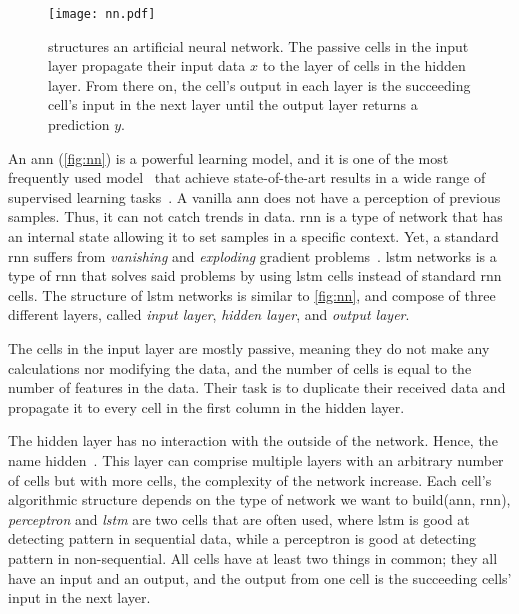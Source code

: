 \begin{figure}
    \centering
    \texttt{[image: nn.pdf]}
    \caption[Architecture - \Acl{ann}]{structures an artificial neural network. The passive cells in the input layer propagate their input data $x$ to the layer of cells in the hidden layer. From there on, the cell's output in each layer is the succeeding cell's input in the next layer until the output layer returns a prediction $y$.}
    \label{fig:nn}
\end{figure}

An \ac{ann} (\autoref{fig:nn}) is a powerful learning model, and it is one of the most frequently used model~\cite{hunt1992neural} that achieve state-of-the-art results in a wide range of supervised learning tasks~\cite{lipton2015critical}. A vanilla \ac{ann} does not have a perception of previous samples. Thus, it can not catch trends in data. \ac{rnn} is a type of network that has an internal state allowing it to set samples in a specific context. Yet, a standard \ac{rnn} suffers from \emph{vanishing} and \emph{exploding} gradient problems~\cite{bengio1994learning}. \ac{lstm} networks is a type of \ac{rnn} that solves said problems by using \ac{lstm} cells instead of standard \ac{rnn} cells. The structure of \ac{lstm} networks is similar to \autoref{fig:nn}, and compose of three different layers, called \emph{input layer}, \emph{hidden layer}, and \emph{output layer}.

The cells in the input layer are mostly passive, meaning they do not make any calculations nor modifying the data, and the number of cells is equal to the number of features in the data. Their task is to duplicate their received data and propagate it to every cell in the first column in the hidden layer.

The hidden layer has no interaction with the outside of the network. Hence, the name hidden~\cite{data_science, stanford}. This layer can comprise multiple layers with an arbitrary number of cells but with more cells, the complexity of the network increase. Each cell's algorithmic structure depends on the type of network we want to build(\ac{ann}, \ac{rnn}), \emph{perceptron} and \emph{lstm} are two cells that are often used, where \ac{lstm} is good at detecting pattern in sequential data, while a perceptron is good at detecting pattern in non-sequential. All cells have at least two things in common; they all have an input and an output, and the output from one cell is the succeeding cells' input in the next layer. 

